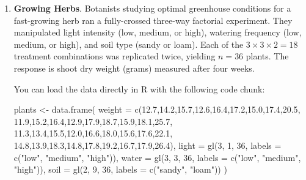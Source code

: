 \documentclass[
  letterpaper,
  DIV=11,
  numbers=noendperiod]{scrartcl}
\newenvironment{Shaded}{\begin{snugshade}}{\end{snugshade}}
\newcommand{\AttributeTok}[1]{\textcolor[rgb]{0.40,0.45,0.13}{#1}}
\newcommand{\DecValTok}[1]{\textcolor[rgb]{0.68,0.00,0.00}{#1}}
\newcommand{\FloatTok}[1]{\textcolor[rgb]{0.68,0.00,0.00}{#1}}
\newcommand{\FunctionTok}[1]{\textcolor[rgb]{0.28,0.35,0.67}{#1}}
\newcommand{\NormalTok}[1]{\textcolor[rgb]{0.00,0.23,0.31}{#1}}
\newcommand{\OtherTok}[1]{\textcolor[rgb]{0.00,0.23,0.31}{#1}}
\newcommand{\StringTok}[1]{\textcolor[rgb]{0.13,0.47,0.30}{#1}}
\begin{document}
\newpage{}

\begin{enumerate}
\def\labelenumi{\arabic{enumi}.}
\setcounter{enumi}{3}
\item
  \textbf{Growing Herbs}. Botanists studying optimal greenhouse
  conditions for a fast-growing herb ran a fully-crossed three-way
  factorial experiment. They manipulated light intensity (low, medium,
  or high), watering frequency (low, medium, or high), and soil type
  (sandy or loam). Each of the \(3 \times 3 \times 2 = 18\) treatment
  combinations was replicated twice, yielding \(n = 36\) plants. The
  response is shoot dry weight (grams) measured after four weeks.

  You can load the data directly in R with the following code chunk:

\begin{Shaded}
\begin{Highlighting}[]
\NormalTok{plants }\OtherTok{\textless{}{-}} \FunctionTok{data.frame}\NormalTok{(}
  \AttributeTok{weight =} \FunctionTok{c}\NormalTok{(}\FloatTok{12.7}\NormalTok{,}\FloatTok{14.2}\NormalTok{,}\FloatTok{15.7}\NormalTok{,}\FloatTok{12.6}\NormalTok{,}\FloatTok{16.4}\NormalTok{,}\FloatTok{17.2}\NormalTok{,}\FloatTok{15.0}\NormalTok{,}\FloatTok{17.4}\NormalTok{,}\FloatTok{20.5}\NormalTok{,}
             \FloatTok{11.9}\NormalTok{,}\FloatTok{15.2}\NormalTok{,}\FloatTok{16.4}\NormalTok{,}\FloatTok{12.9}\NormalTok{,}\FloatTok{17.9}\NormalTok{,}\FloatTok{18.7}\NormalTok{,}\FloatTok{15.9}\NormalTok{,}\FloatTok{18.1}\NormalTok{,}\FloatTok{25.7}\NormalTok{,}
             \FloatTok{11.3}\NormalTok{,}\FloatTok{13.4}\NormalTok{,}\FloatTok{15.5}\NormalTok{,}\FloatTok{12.0}\NormalTok{,}\FloatTok{16.6}\NormalTok{,}\FloatTok{18.0}\NormalTok{,}\FloatTok{15.6}\NormalTok{,}\FloatTok{17.6}\NormalTok{,}\FloatTok{22.1}\NormalTok{,}
             \FloatTok{14.8}\NormalTok{,}\FloatTok{13.9}\NormalTok{,}\FloatTok{18.3}\NormalTok{,}\FloatTok{14.8}\NormalTok{,}\FloatTok{17.8}\NormalTok{,}\FloatTok{19.2}\NormalTok{,}\FloatTok{16.7}\NormalTok{,}\FloatTok{17.9}\NormalTok{,}\FloatTok{26.4}\NormalTok{),}
  \AttributeTok{light  =} \FunctionTok{gl}\NormalTok{(}\DecValTok{3}\NormalTok{, }\DecValTok{1}\NormalTok{, }\DecValTok{36}\NormalTok{, }\AttributeTok{labels =} \FunctionTok{c}\NormalTok{(}\StringTok{"low"}\NormalTok{, }\StringTok{"medium"}\NormalTok{, }\StringTok{"high"}\NormalTok{)),}
  \AttributeTok{water  =} \FunctionTok{gl}\NormalTok{(}\DecValTok{3}\NormalTok{, }\DecValTok{3}\NormalTok{, }\DecValTok{36}\NormalTok{, }\AttributeTok{labels =} \FunctionTok{c}\NormalTok{(}\StringTok{"low"}\NormalTok{, }\StringTok{"medium"}\NormalTok{, }\StringTok{"high"}\NormalTok{)),}
  \AttributeTok{soil   =} \FunctionTok{gl}\NormalTok{(}\DecValTok{2}\NormalTok{, }\DecValTok{9}\NormalTok{, }\DecValTok{36}\NormalTok{, }\AttributeTok{labels =} \FunctionTok{c}\NormalTok{(}\StringTok{"sandy"}\NormalTok{, }\StringTok{"loam"}\NormalTok{))}
\NormalTok{)}
\end{Highlighting}
\end{Shaded}


\end{enumerate}
\end{document}

